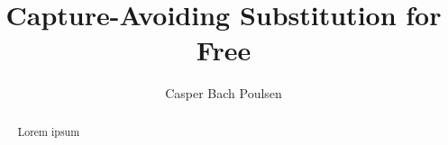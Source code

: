 \documentclass[12pt,a4paper]{article}
\title{Capture-Avoiding Substitution for Free}
\author{Casper Bach Poulsen}
\date{}
\begin{document}
\maketitle

\begin{abstract}
  Lorem ipsum
\end{abstract}








\end{document}
